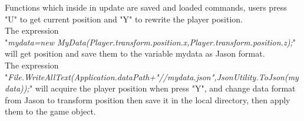 \begin{itemize}
Functions which inside in update are saved and loaded commands, users press "U" to get current position and "Y" to rewrite the player position.\\
The expression \\
"\emph{mydata=new MyData(Player.transform.position.x,Player.transform.position.z);}" will get position and save them to the variable mydata as Jason format.\\
The expression \\
"\emph{File.WriteAllText(Application.dataPath+"//mydata.json",JsonUtility.ToJson(mydata));}" will acquire the player position when press "Y", and change data format from Jason to transform position then save it in the local directory, then apply them to the game object.
\end{itemize}

